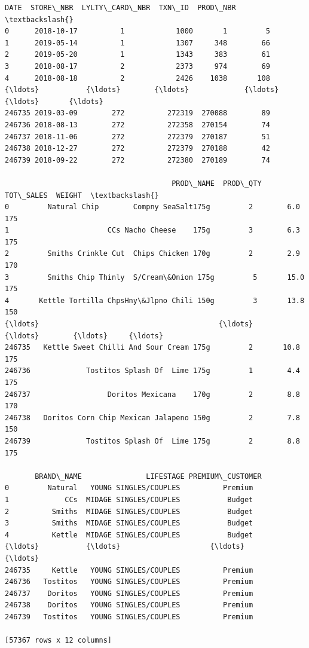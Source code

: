 \documentclass[11pt]{article}
\makeatletter
\newcommand{\boxspacing}{\kern\kvtcb@left@rule\kern\kvtcb@boxsep}
\newcommand{\prompt}[4]{
        {\ttfamily\llap{{\color{#2}[#3]:\hspace{3pt}#4}}\vspace{-\baselineskip}}
    }
\makeatother
\begin{document}
            \begin{tcolorbox}[breakable, size=fbox, boxrule=.5pt, pad at break*=1mm, opacityfill=0]
\prompt{Out}{outcolor}{329}{\boxspacing}
\begin{Verbatim}[commandchars=\\\{\}]
             DATE  STORE\_NBR  LYLTY\_CARD\_NBR  TXN\_ID  PROD\_NBR  \textbackslash{}
0      2018-10-17          1            1000       1         5
1      2019-05-14          1            1307     348        66
2      2019-05-20          1            1343     383        61
3      2018-08-17          2            2373     974        69
4      2018-08-18          2            2426    1038       108
{\ldots}           {\ldots}        {\ldots}             {\ldots}     {\ldots}       {\ldots}
246735 2019-03-09        272          272319  270088        89
246736 2018-08-13        272          272358  270154        74
246737 2018-11-06        272          272379  270187        51
246738 2018-12-27        272          272379  270188        42
246739 2018-09-22        272          272380  270189        74

                                       PROD\_NAME  PROD\_QTY  TOT\_SALES  WEIGHT  \textbackslash{}
0         Natural Chip        Compny SeaSalt175g         2        6.0     175
1                       CCs Nacho Cheese    175g         3        6.3     175
2         Smiths Crinkle Cut  Chips Chicken 170g         2        2.9     170
3         Smiths Chip Thinly  S/Cream\&Onion 175g         5       15.0     175
4       Kettle Tortilla ChpsHny\&Jlpno Chili 150g         3       13.8     150
{\ldots}                                          {\ldots}       {\ldots}        {\ldots}     {\ldots}
246735   Kettle Sweet Chilli And Sour Cream 175g         2       10.8     175
246736             Tostitos Splash Of  Lime 175g         1        4.4     175
246737                  Doritos Mexicana    170g         2        8.8     170
246738   Doritos Corn Chip Mexican Jalapeno 150g         2        7.8     150
246739             Tostitos Splash Of  Lime 175g         2        8.8     175

       BRAND\_NAME               LIFESTAGE PREMIUM\_CUSTOMER
0         Natural   YOUNG SINGLES/COUPLES          Premium
1             CCs  MIDAGE SINGLES/COUPLES           Budget
2          Smiths  MIDAGE SINGLES/COUPLES           Budget
3          Smiths  MIDAGE SINGLES/COUPLES           Budget
4          Kettle  MIDAGE SINGLES/COUPLES           Budget
{\ldots}           {\ldots}                     {\ldots}              {\ldots}
246735     Kettle   YOUNG SINGLES/COUPLES          Premium
246736   Tostitos   YOUNG SINGLES/COUPLES          Premium
246737    Doritos   YOUNG SINGLES/COUPLES          Premium
246738    Doritos   YOUNG SINGLES/COUPLES          Premium
246739   Tostitos   YOUNG SINGLES/COUPLES          Premium

[57367 rows x 12 columns]
\end{Verbatim}
\end{tcolorbox}
        
\end{document}
